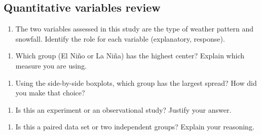 \documentclass[
]{report}
\providecommand{\tightlist}{%
  \setlength{\itemsep}{0pt}\setlength{\parskip}{0pt}}
\begin{document}
\hypertarget{quantitative-variables-review}{%
\subsection*{Quantitative variables review}\label{quantitative-variables-review}}

\begin{enumerate}
\def\labelenumi{\arabic{enumi}.}
\tightlist
\item
  The two variables assessed in this study are the type of weather pattern and snowfall. Identify the role for each variable (explanatory, response).
\end{enumerate}

\vspace{.6in}

\begin{enumerate}
\def\labelenumi{\arabic{enumi}.}
\setcounter{enumi}{1}
\tightlist
\item
  Which group (El Ni\~{n}o or La Ni\~{n}a) has the highest center? Explain which measure you are using.
\end{enumerate}

\vspace{.6in}

\begin{enumerate}
\def\labelenumi{\arabic{enumi}.}
\setcounter{enumi}{2}
\tightlist
\item
  Using the side-by-side boxplots, which group has the largest spread? How did you make that choice?
\end{enumerate}

\vspace{.6in}

\newpage

\begin{enumerate}
\def\labelenumi{\arabic{enumi}.}
\setcounter{enumi}{3}
\tightlist
\item
  Is this an experiment or an observational study? Justify your answer.
\end{enumerate}

\vspace{1in}

\begin{enumerate}
\def\labelenumi{\arabic{enumi}.}
\setcounter{enumi}{4}
\tightlist
\item
  Is this a paired data set or two independent groups? Explain your reasoning.
\end{enumerate}
\end{document}
